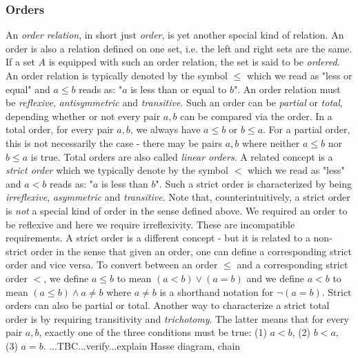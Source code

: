 



\subsubsection{Orders} \label{Par:Orders} An \emph{order relation}, in short just \emph{order}, is yet another special kind of relation. An order is also a relation defined on one set, i.e. the left and right sets are the same. If a set $A$ is equipped with such an order relation, the set is said to be \emph{ordered}. An order relation is typically denoted by the symbol $\leq$ which we read as "less or equal" and $a \leq b$ reads as: "$a$ is less than or equal to $b$". An order relation must be \emph{reflexive}, \emph{antisymmetric} and \emph{transitive}. Such an order can be \emph{partial} or \emph{total}, depending whether or not every pair $a,b$ can be compared via the order. In a total order, for every pair $a,b$, we always have $a \leq b$ or $b \leq a$. For a partial order, this is not necessarily the case - there may be pairs $a,b$ where neither $a \leq b$ nor $b \leq a$ is true. Total orders are also called \emph{linear orders}. A related concept is a \emph{strict order} which we typically denote by the symbol $<$ which we read as "less" and $a < b$ reads as: "$a$ is less than $b$". Such a strict order is characterized by being \emph{irreflexive}, \emph{asymmetric} and \emph{transitive}. Note that, counterintuitively, a strict order is \emph{not} a special kind of order in the sense defined above. We required an order to be reflexive and here we require irreflexivity. These are incompatible requirements. A strict order is a different concept - but it is related to a non-strict order in the sense that given an order, one can define a corresponding strict order and vice versa. To convert between an order $\leq$ and a corresponding strict order $<$, we define $a \leq b$ to mean $(a < b) \vee (a = b)$ and we define $a < b$ to mean $(a \leq b) \wedge a \neq b$ where $a \neq b$ is a shorthand notation for $\neg (a = b)$. Strict orders can also be partial or total. Another way to characterize a strict total order is by requiring transitivity and \emph{trichotomy}. The latter means that for every pair $a,b$, exactly one of the three conditions must be true: (1) $a < b$, (2) $b < a$, (3) $a = b$.
 ...TBC...verify...explain Hasse diagram, chain
 
